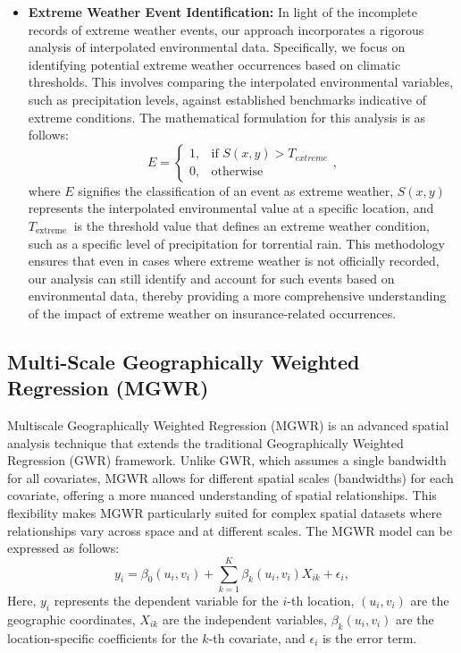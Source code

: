 \documentclass[12pt]{article}
\begin{document}
\begin{itemize}
\item \textbf{Extreme Weather Event Identification:} In light of the incomplete records of extreme weather events, our approach incorporates a rigorous analysis of interpolated environmental data. Specifically, we focus on identifying potential extreme weather occurrences based on climatic thresholds. This involves comparing the interpolated environmental variables, such as precipitation levels, against established benchmarks indicative of extreme conditions. The mathematical formulation for this analysis is as follows:
\begin{equation}
E = \begin{cases}
1, & \text{if } S(x, y) > T_{extreme} \\
0, & \text{otherwise}
\end{cases},
\end{equation}
where $E$ signifies the classification of an event as extreme weather, $S(x, y)$ represents the interpolated environmental value at a specific location, and $T_{\text {extreme }}$ is the threshold value that defines an extreme weather condition, such as a specific level of precipitation for torrential rain. This methodology ensures that even in cases where extreme weather is not officially recorded, our analysis can still identify and account for such events based on environmental data, thereby providing a more comprehensive understanding of the impact of extreme weather on insurance-related occurrences.
\end{itemize}

\subsection{Multi-Scale Geographically Weighted Regression (MGWR)}
Multiscale Geographically Weighted Regression (MGWR) is an advanced spatial analysis technique that extends the traditional Geographically Weighted Regression (GWR) framework. Unlike GWR, which assumes a single bandwidth for all covariates, MGWR allows for different spatial scales (bandwidths) for each covariate, offering a more nuanced understanding of spatial relationships. This flexibility makes MGWR particularly suited for complex spatial datasets where relationships vary across space and at different scales. The MGWR model can be expressed as follows:
\begin{equation}
y_i = \beta_0(u_i,v_i) + \sum_{k=1}^{K} \beta_k(u_i,v_i)X_{ik} + \epsilon_i,
\end{equation}
Here, $y_i$ represents the dependent variable for the $i$-th location, $\left(u_i, v_i\right)$ are the geographic coordinates, $X_{i k}$ are the independent variables, $\beta_k\left(u_i, v_i\right)$ are the location-specific coefficients for the $k$-th covariate, and $\epsilon_i$ is the error term.
\end{document}
